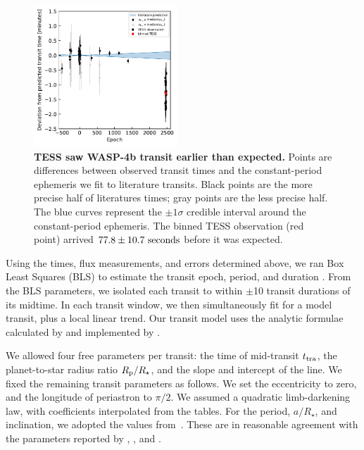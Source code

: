 \documentclass[12pt,twocolumn,tighten]{aastex62}
\begin{document}
\begin{figure}[t]
    \begin{center}
        \leavevmode
        \includegraphics[width=0.48\textwidth]{f2.pdf}
    \end{center}
    \vspace{-0.5cm}
    \caption{
        {\bf TESS saw WASP-4b transit earlier than expected.}
        Points are differences between observed transit times and the
        constant-period ephemeris we fit to literature transits.
        Black points are the more precise half of literatures times;
        gray points are the less precise half.  The blue curves
        represent the $\pm 1\sigma$ credible interval around the
        constant-period ephemeris.  The binned TESS observation (red
        point) arrived $77.8 \pm 10.7\ {\rm seconds}$ before it was
        expected.
        \label{fig:arrived_early}
    }
\end{figure}

Using the times, flux measurements, and errors determined above, we ran
Box Least Squares (BLS) to estimate the transit epoch, period, and
duration \citep{kovacs_box-fitting_2002}.  From the BLS parameters, we
isolated each transit to within $\pm$10 transit durations of its
midtime.  In each transit window, we then simultaneously fit for a model
transit, plus a local linear trend.  Our transit model uses the analytic
formulae calculated by \citet{mandel_analytic_2002} and implemented by
\citet{kreidberg_batman_2015}.

We allowed four free parameters per transit: the
time of mid-transit $t_{\rm tra}$, the planet-to-star radius ratio
$R_{\rm p}/R_\star$, and the slope and intercept of the line.
We fixed the remaining transit parameters as follows.  We set the
eccentricity to zero, and the longitude of periastron to $\pi/2$.  We
assumed a quadratic limb-darkening law, with coefficients interpolated
from the \citet{claret_limb_2017} tables.  For the period, $a/R_\star$,
and inclination, we adopted the values from~\citet{petrucci_no_2013}.
These are in reasonable agreement with the parameters reported by
\citet{gillon_improved_2009}, \citet{southworth_high-precision_2009},
and \citet{huitson_gemini_2017}.
\end{document}
